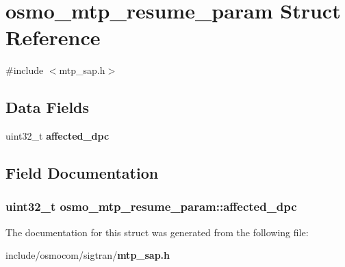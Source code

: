 \section{osmo\+\_\+mtp\+\_\+resume\+\_\+param Struct Reference}
\label{structosmo__mtp__resume__param}


{\ttfamily \#include $<$mtp\+\_\+sap.\+h$>$}

\subsection*{Data Fields}
\begin{DoxyCompactItemize}
\item 
uint32\+\_\+t {\bf affected\+\_\+dpc}
\end{DoxyCompactItemize}


\subsection{Field Documentation}
\subsubsection[{affected\+\_\+dpc}]{\setlength{\rightskip}{0pt plus 5cm}uint32\+\_\+t osmo\+\_\+mtp\+\_\+resume\+\_\+param\+::affected\+\_\+dpc}\label{structosmo__mtp__resume__param_aa135777137e7c13209515a18979d4da8}


The documentation for this struct was generated from the following file\+:\begin{DoxyCompactItemize}
\item 
include/osmocom/sigtran/{\bf mtp\+\_\+sap.\+h}\end{DoxyCompactItemize}
